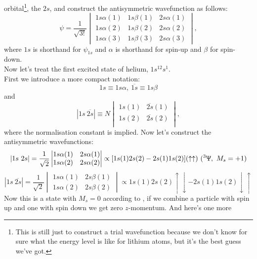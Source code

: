 orbital\footnote{This is still just to construct a trial wavefunction because we don't know for sure what the energy level is like for lithium atoms, but it's the best guess we've got.}, the $2s$, and construct the antisymmetric wavefunction as follows:
\begin{equation}
\psi=\frac{1}{\sqrt{3!}}
\begin{vmatrix}
1s\alpha(1)&1s\beta(1)&2s\alpha(1)\\
1s\alpha(2)&1s\beta(2)&2s\alpha(2)\\
1s\alpha(3)&1s\beta(3)&2s\alpha(3)
\end{vmatrix}, 
\end{equation}
where $1s$ is shorthand for $\psi_{1s}$ and $\alpha$ is shorthand for spin-up and $\beta$ for spin-down. \\
Now let's treat the first excited state of helium, $1s^12s^1$. \\
First we introduce a more compact notation\cite{hughbanks}:
\begin{equation}
1s\equiv1s\alpha,\ \overline{1s}\equiv1s\beta
\end{equation}
and
\begin{equation}
|1s\ \overline{2s}|\equiv N
\begin{vmatrix}
1s(1)&\overline{2s}(1)\\
1s(2)&\overline{2s}(2)\\
\end{vmatrix}, 
\end{equation}
where the normalisation constant is implied. 
Now let's construct the antisymmetric wavefunctions: 
\begin{equation}
|1s\ 2s|=\frac{1}{\sqrt{2}}
\begin{vmatrix}
1s\alpha(1)&2s\alpha(1)\\
1s\alpha(2)&2s\alpha(2)
\end{vmatrix}\propto[1s(1)2s(2)-2s(1)1s(2)](\uparrow\uparrow)\ (^3\ups,\ M_s=+1)
\end{equation}
\begin{equation}
|1s\ \overline{2s}|=\frac{1}{\sqrt{2}}
\begin{vmatrix}
1s\alpha(1)&2s\beta(1)\\
1s\alpha(2)&2s\beta(2)
\end{vmatrix}\propto1s(1)2s(2)\uparrow\downarrow-2s(1)1s(2)\downarrow\uparrow
\end{equation}
Now this is a state with $M_s=0$ according to , if we combine a particle 
with spin up and one with spin down we get zero $z$-momentum. And here's one more
